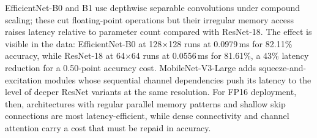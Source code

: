 \documentclass[conference]{IEEEtran}
\begin{document}
EfficientNet-B0 and B1 use depthwise separable convolutions under compound scaling; these cut floating-point operations but their irregular memory access raises latency relative to parameter count compared with ResNet-18. The effect is visible in the data: EfficientNet-B0 at 128$\times$128 runs at 0.0979\,ms for 82.11\% accuracy, while ResNet-18 at 64$\times$64 runs at 0.0556\,ms for 81.61\%, a 43\% latency reduction for a 0.50-point accuracy cost. MobileNet-V3-Large adds squeeze-and-excitation modules whose sequential channel dependencies push its latency to the level of deeper ResNet variants at the same resolution. For FP16 deployment, then, architectures with regular parallel memory patterns and shallow skip connections are most latency-efficient, while dense connectivity and channel attention carry a cost that must be repaid in accuracy.
\end{document}
